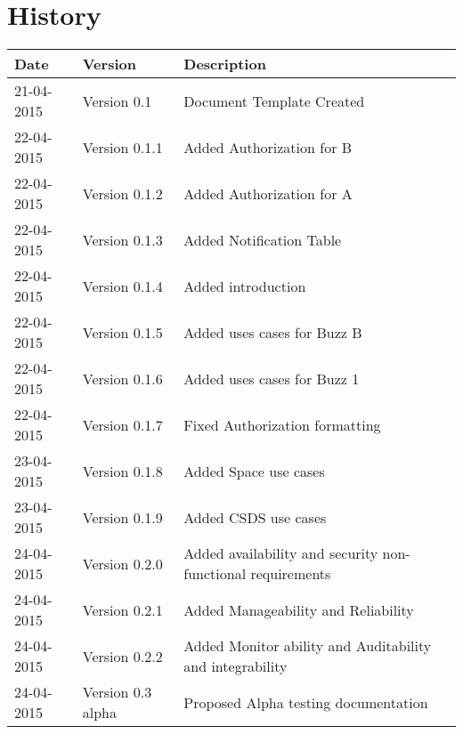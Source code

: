 \documentclass[12pt]{article}
\begin{document}


\section{History}
\begin{tabular}{|p{3cm}|p{5cm}|p{6cm}|}

\hline
Date & Version & Description\\ %
\hline
21-04-2015 & Version 0.1 & Document Template Created\\ %
\hline
22-04-2015 & Version 0.1.1 & Added Authorization for B\\ %
\hline
22-04-2015 & Version 0.1.2 & Added Authorization for A\\ %
\hline
22-04-2015 & Version 0.1.3 & Added Notification Table\\ %
\hline
22-04-2015 & Version 0.1.4 & Added introduction\\ %
\hline
22-04-2015 & Version 0.1.5 & Added uses cases for Buzz B\\ %
\hline
22-04-2015 & Version 0.1.6 & Added uses cases for Buzz 1\\ %
\hline
22-04-2015 & Version 0.1.7 & Fixed Authorization formatting\\ %
\hline
23-04-2015 & Version 0.1.8 & Added Space use cases\\ %
\hline
23-04-2015 & Version 0.1.9 & Added CSDS use cases\\ %
\hline
24-04-2015 & Version 0.2.0 & Added availability and security non-functional requirements\\ %
\hline
24-04-2015 & Version 0.2.1 & Added Manageability and Reliability\\ %
\hline
24-04-2015 & Version 0.2.2 & Added Monitor ability and Auditability and integrability\\ %
\hline
24-04-2015 & Version 0.3 alpha & Proposed Alpha testing documentation\\ %
\hline
\end{tabular}
\end{document}
